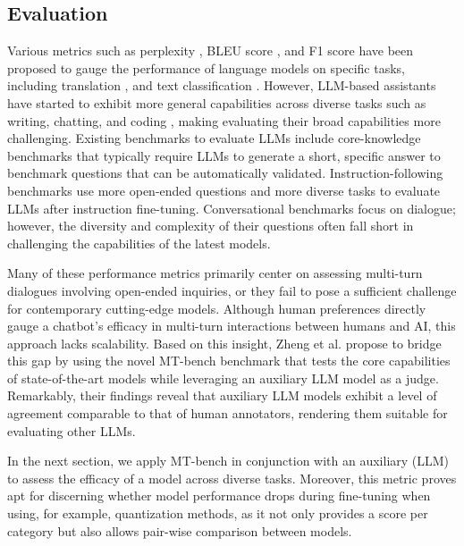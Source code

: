 \documentclass[conference]{IEEEtran}
\begin{document}
\subsection{Evaluation}
\label{sec:eval}
Various metrics such as perplexity \cite{jelinek_perplexitymeasure_1977}, BLEU score \cite{papineni_bleu_2002}, and F1 score have been proposed to gauge the performance of language models on specific tasks, including translation \cite{singh_machine_2017}, and text classification \cite{minaee_deep_2022}.
However, LLM-based assistants have started to exhibit more general capabilities across diverse tasks such as writing, chatting, and coding \cite{anil_palm_2023, touvron_llama_2023, bubeck_sparks_2023, srivastava_beyond_2023}, making evaluating their broad capabilities more challenging.
Existing benchmarks to evaluate LLMs include core-knowledge benchmarks \cite{clark_think_2018, zellers_hellaswag_2019, hendrycks_measuring_2021, sakaguchi_winogrande_2021, chen_evaluating_2021, cobbe_training_2021, zhong_agieval_2023} that typically require LLMs to generate a short, specific answer to benchmark questions that can be automatically validated.
Instruction-following benchmarks \cite{wei_finetuned_2022, mishra_cross-task_2022, wang_super-naturalinstructions_2022, longpre_flan_2023, wang_self-instruct_2023} use more open-ended questions and more diverse tasks to evaluate LLMs after instruction fine-tuning.
Conversational benchmarks \cite{reddy_coqa_2019, feng_mmdialog_2022, kopf_openassistant_2023} focus on dialogue; however, the diversity and complexity of their questions often fall short in challenging the capabilities of the latest models.

Many of these performance metrics primarily center on assessing multi-turn dialogues involving open-ended inquiries, or they fail to pose a sufficient challenge for contemporary cutting-edge models. Although human preferences directly gauge a chatbot's efficacy in multi-turn interactions between humans and AI, this approach lacks scalability. Based on this insight, Zheng et al. \cite{zheng_judging_2023} propose to bridge this gap by using the novel MT-bench benchmark that tests the core capabilities of state-of-the-art models while leveraging an auxiliary LLM model as a judge.
Remarkably, their findings reveal that auxiliary LLM models exhibit a level of agreement comparable to that of human annotators, rendering them suitable for evaluating other LLMs.

In the next section, we apply MT-bench in conjunction with an auxiliary (LLM) to assess the efficacy of a model across diverse tasks. Moreover, this metric proves apt for discerning whether model performance drops during fine-tuning when using, for example, quantization methods, as it not only provides a score per category but also allows pair-wise comparison between models.
\end{document}
